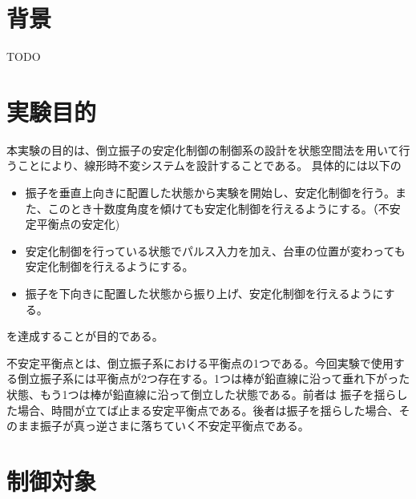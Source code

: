 \section{背景}
TODO
\section{実験目的}
本実験の目的は、倒立振子の安定化制御の制御系の設計を状態空間法を用いて行うことにより、線形時不変システムを設計することである。
具体的には以下の
\begin{itemize}
	\item 振子を垂直上向きに配置した状態から実験を開始し、安定化制御を行う。また、このとき十数度角度を傾けても安定化制御を行えるようにする。（不安定平衡点の安定化)
	\item 安定化制御を行っている状態でパルス入力を加え、台車の位置が変わっても安定化制御を行えるようにする。
	\item 振子を下向きに配置した状態から振り上げ、安定化制御を行えるようにする。
\end{itemize}
を達成することが目的である。
\par
不安定平衡点とは、倒立振子系における平衡点の1つである。今回実験で使用する倒立振子系には平衡点が2つ存在する。1つは棒が鉛直線に沿って垂れ下がった状態、もう1つは棒が鉛直線に沿って倒立した状態である。前者は
振子を揺らした場合、時間が立てば止まる安定平衡点である。後者は振子を揺らした場合、そのまま振子が真っ逆さまに落ちていく不安定平衡点である。
\newpage

\section{制御対象}
